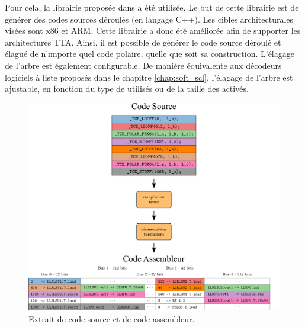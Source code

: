 Pour cela, la librairie proposée dans \cite{cassagne_efficient_2015} a été utilisée. Le but de cette librairie est de générer des codes sources déroulés (en langage C++). Les cibles architecturales visées sont x86 et ARM. Cette librairie a donc été améliorée afin de supporter les architectures TTA. Ainsi, il est possible de générer le code source déroulé et élagué de n'importe quel code polaire, quelle que soit sa construction. L'élagage de l'arbre est également configurable. De manière équivalente aux décodeurs logiciels à liste proposés dans le chapitre \ref{chap:soft_scl}, l'élagage de l'arbre est ajustable, en fonction du type de \noeuds utilisés ou de la taille des \noeuds activés.


\begin{figure}[t]
\centering
\includegraphics[width=\textwidth]{main/ch4_fig/ilp_1}
\caption{Extrait de code source et de code assembleur.}
\label{fig:ilp_1}
\end{figure}


